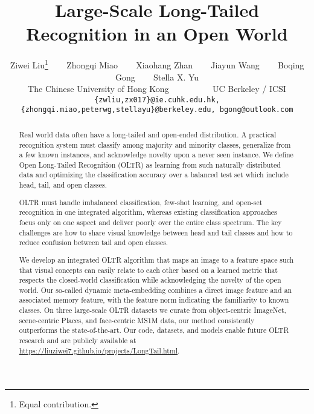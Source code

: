 \documentclass[10pt,twocolumn,letterpaper]{article}
\begin{document}
\title{Large-Scale Long-Tailed Recognition in an Open World}

\author{Ziwei Liu\thanks{Equal contribution.} ~~~ Zhongqi Miao ~~~ Xiaohang Zhan ~~~ Jiayun Wang ~~~ Boqing Gong ~~~ Stella X. Yu \\
 The Chinese University of Hong Kong ~~~~~~~~~  UC Berkeley / ICSI\\
{\tt\small \{zwliu,zx017\}@ie.cuhk.edu.hk, \{zhongqi.miao,peterwg,stellayu\}@berkeley.edu, bgong@outlook.com}
}

\maketitle
\thispagestyle{empty}

\begin{abstract}






Real world data often have a long-tailed and open-ended distribution. A practical recognition system must classify among majority and minority classes, generalize from a few known instances, and acknowledge novelty upon a never seen instance.  We define Open Long-Tailed Recognition (OLTR) as learning from such naturally distributed data and optimizing the classification accuracy over a balanced test set which include head, tail, and open classes.

OLTR must handle imbalanced classification, few-shot learning, and open-set recognition in one integrated algorithm, whereas existing classification approaches focus only on one aspect and  deliver poorly over the entire class spectrum.  The key challenges are how to share visual knowledge between head and tail classes and how to reduce confusion between tail and open classes.

We develop an integrated OLTR algorithm that maps an image to a feature space such that visual concepts can easily relate to each other based on a learned metric that respects the closed-world classification while acknowledging the novelty of the open world.  Our so-called dynamic meta-embedding combines a direct image feature and an associated memory feature, with the feature norm indicating the familiarity to known classes.
On three large-scale OLTR datasets we curate from object-centric ImageNet, scene-centric Places, and face-centric MS1M data, our method consistently outperforms the state-of-the-art.  Our code, datasets, and models enable future OLTR research and are publicly available at \url{https://liuziwei7.github.io/projects/LongTail.html}.
    
\end{abstract}
 
\end{document}
